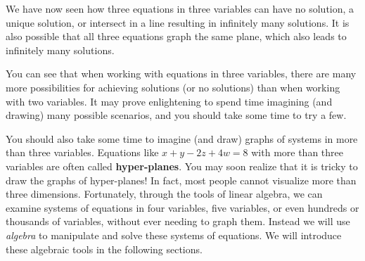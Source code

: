 We have now seen how three equations in three variables can have no solution, a unique solution, or intersect in a line resulting in infinitely many solutions. 
It is also possible that all three equations graph the same plane, which also leads to infinitely many solutions. 

You can see that when working with equations in three variables, there are
many more possibilities for achieving solutions (or no solutions) than when working with two variables. It may prove enlightening to 
spend time imagining (and drawing) many possible scenarios, and you should take some time to try a few. 

You should also take some time to imagine (and draw) graphs of systems in more than three variables. 
Equations  like $x+y-2z+4w=8$ with more than three variables are often called \textbf{hyper-planes}.
You may soon realize that it is tricky to draw the graphs of hyper-planes! In fact, most people cannot visualize more than three dimensions. Fortunately, through the tools of linear algebra, 
we can examine systems of equations in four variables, five variables, or even hundreds or thousands of variables, without ever needing to graph them. Instead we will use {\em algebra} to manipulate and solve these systems of equations. We will introduce these algebraic tools in the following sections.
